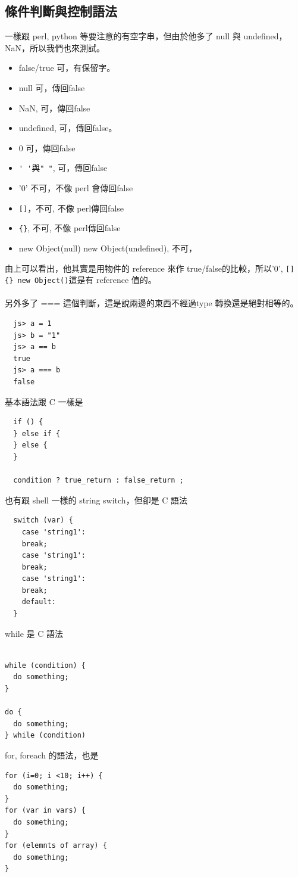   \subsection{條件判斷與控制語法}
  一樣跟 perl, python 等要注意的有空字串，但由於他多了 null 與 undefined，
  NaN，所以我們也來測試。
  \begin{itemize}
    \item false/true 可，有保留字。
    \item null 可，傳回false
    \item NaN, 可，傳回false
    \item undefined, 可，傳回false。
    \item 0 可，傳回false
    \item \verb=' '=與\verb=" "=, 可，傳回false
    \item '0'  不可，不像 perl 會傳回false
    \item \verb=[]=，不可, 不像 perl傳回false
    \item \verb={}=, 不可, 不像 perl傳回false
    \item new Object(null) new Object(undefined), 不可，
  \end{itemize}
  由上可以看出，他其實是用物件的 reference 來作 true/false的比較，所以'0',
  \verb=[] {} new Object()=這是有 reference 值的。
  \\\\
  另外多了 === 這個判斷，這是說兩邊的東西不經過type 轉換還是絕對相等的。
  \begin{verbatim}
  js> a = 1
  js> b = "1"
  js> a == b
  true
  js> a === b
  false
  \end{verbatim}
  基本語法跟 C 一樣是
  \begin{verbatim}
  if () {
  } else if {
  } else {
  }

  condition ? true_return : false_return ; 
  \end{verbatim}
  也有跟 shell 一樣的 string switch，但卻是 C 語法
  \begin{verbatim}
  switch (var) {
    case 'string1':
    break;
    case 'string1':
    break;
    case 'string1':
    break;
    default:
  }
  \end{verbatim}
  while 是 C 語法
  \begin{verbatim}

while (condition) {
  do something;
}

do {
  do something;
} while (condition)
  \end{verbatim}
  for, foreach 的語法，也是
  \begin{verbatim}
for (i=0; i <10; i++) {
  do something;
}
for (var in vars) {
  do something;
}
for (elemnts of array) {
  do something;
}
  \end{verbatim}
